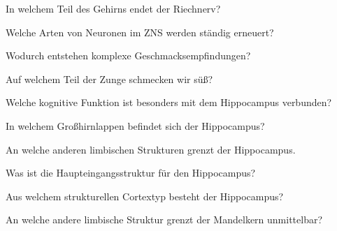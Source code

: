 \documentclass[10pt, a4paper]{exam}
\begin{document}
\begin{questions}
\begin{solution}
  \end{solution}

  \question In welchem Teil des Gehirns endet der Riechnerv?
  \begin{solution}

  \end{solution}

  \question Welche Arten von Neuronen im ZNS werden ständig erneuert?
  \begin{solution}

  \end{solution}

  \question Wodurch entstehen komplexe Geschmacksempfindungen?
  \begin{solution}

  \end{solution}

  \question Auf welchem Teil der Zunge schmecken wir süß?
  \begin{solution}

  \end{solution}

  \question Welche kognitive Funktion ist besonders mit dem Hippocampus verbunden?
  \begin{solution}

  \end{solution}

  \question In welchem Großhirnlappen befindet sich der Hippocampus?
  \begin{solution}

  \end{solution}

  \question An welche anderen limbischen Strukturen grenzt der Hippocampus.
  \begin{solution}

  \end{solution}

  \question Was ist die Haupteingangsstruktur für den Hippocampus?
  \begin{solution}

  \end{solution}

  \question Aus welchem strukturellen Cortextyp besteht der Hippocampus?
  \begin{solution}

  \end{solution}

  \question An welche andere limbische Struktur grenzt der Mandelkern unmittelbar?
  \begin{solution}


\end{solution}
\end{questions}
\end{document}
